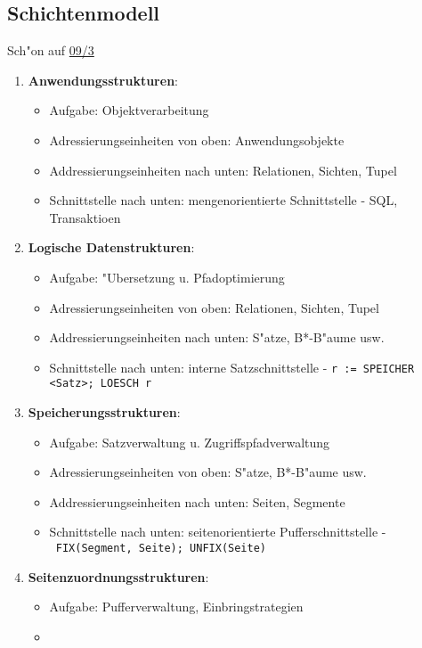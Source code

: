\documentclass[a4paper, 12pt]{scrartcl}
\begin{document}
\subsection{Schichtenmodell}
Sch"on auf \href{site:IDB-2015WS-09-Speicherung.pdf}{09/3}
\begin{enumerate}
	\item
		\textbf{Anwendungsstrukturen}:
		\begin{itemize}
			\item
				Aufgabe: Objektverarbeitung
			\item
				Adressierungseinheiten von oben: Anwendungsobjekte
			\item
				Addressierungseinheiten nach unten: Relationen, Sichten, Tupel
			\item
				Schnittstelle nach unten: mengenorientierte Schnittstelle - SQL, Transaktioen
		\end{itemize}
	\item
		\textbf{Logische Datenstrukturen}:
		\begin{itemize}
			\item
				Aufgabe: "Ubersetzung u. Pfadoptimierung
			\item
				Adressierungseinheiten von oben: Relationen, Sichten, Tupel
			\item
				Addressierungseinheiten nach unten: S"atze, B*-B"aume usw.
			\item
				Schnittstelle nach unten: interne Satzschnittstelle - \lstinline$r := SPEICHER <Satz>; LOESCH r$
		\end{itemize}
	\item
		\textbf{Speicherungsstrukturen}:
		\begin{itemize}
			\item
				Aufgabe: Satzverwaltung u. Zugriffspfadverwaltung
			\item
				Adressierungseinheiten von oben: S"atze, B*-B"aume usw.
			\item
				Addressierungseinheiten nach unten: Seiten, Segmente
			\item
				Schnittstelle nach unten: seitenorientierte Pufferschnittstelle - \\ \lstinline$ FIX(Segment, Seite); UNFIX(Seite)$
		\end{itemize}
	\item
		\textbf{Seitenzuordnungsstrukturen}:
		\begin{itemize}
			\item
				Aufgabe: Pufferverwaltung, Einbringstrategien
			\item

\end{itemize}
\end{enumerate}
\end{document}
